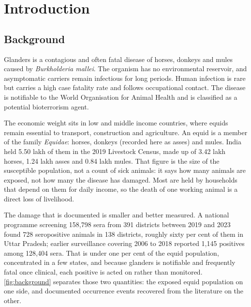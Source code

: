 \documentclass[10pt,openany]{report}
\begin{document}
\chapter{Introduction}
\label{ch:intro}

\section{Background}

Glanders is a contagious and often fatal disease of horses, donkeys and mules caused by
\textit{Burkholderia mallei}. The organism has no environmental reservoir, and asymptomatic
carriers remain infectious for long periods. Human infection is rare but carries a high case
fatality rate and follows occupational contact. The disease is notifiable to the World
Organisation for Animal Health and is classified as a potential bioterrorism agent.

The economic weight sits in low and middle income countries, where equids remain essential to
transport, construction and agriculture. An equid is a member of the family \emph{Equidae}: horses,
donkeys (recorded here as asses) and mules. India held 5.50 lakh of them in the 2019 Livestock
Census, made up of 3.42 lakh horses, 1.24 lakh asses and 0.84 lakh mules. That figure is the size of
the susceptible population, not a count of sick animals: it says how many animals are exposed, not how
many the disease has damaged. Most are held by households that depend on them for daily income, so the
death of one working animal is a direct loss of livelihood.

The damage that is documented is smaller and better measured. A national programme screening
158,798 sera from 391 districts between 2019 and 2023 found 728 seropositive animals in 138 districts,
roughly sixty per cent of them in Uttar Pradesh; earlier surveillance covering 2006 to 2018 reported
1,145 positives among 128,404 sera. That is under one per cent of the equid population, concentrated
in a few states, and because glanders is notifiable and frequently fatal once clinical, each positive
is acted on rather than monitored. \cref{fig:background} separates those two quantities: the
exposed equid population on one side, and documented occurrence events recovered from the literature
on the other.
\end{document}
